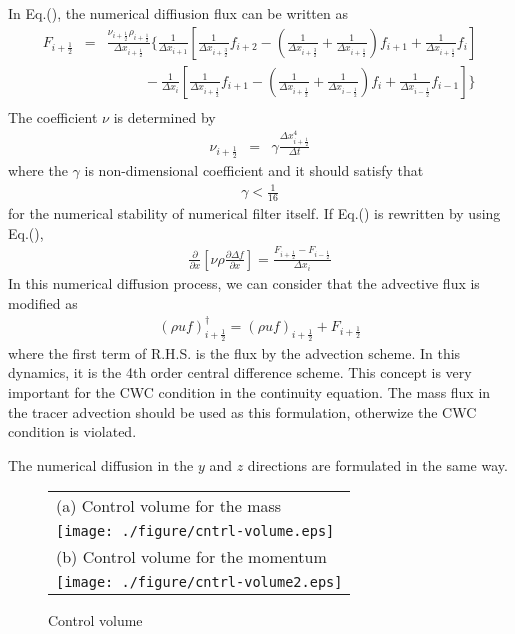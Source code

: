 In Eq.(), the numerical diffiusion flux can be written as
{\footnotesize
\begin{eqnarray}
F_{i+\frac{1}{2}}&=&\frac{\nu_{i+\frac{1}{2}}\rho_{i+\frac{1}{2}}}{\Delta x_{i+\frac{1}{2}}}
\Bigg\{\frac{1}{\Delta x_{i+1}}\left[
\frac{1}{\Delta x_{i+\frac{3}{2}}}f_{i+2}
-\left(\frac{1}{\Delta x_{i+\frac{3}{2}}}+\frac{1}{\Delta x_{i+\frac{1}{2}}}\right)f_{i+1}
+\frac{1}{\Delta x_{i+\frac{1}{2}}}f_{i}\right]\nonumber\\
&&~~~~~~~~~~~~ -\frac{1}{\Delta x_i}\left[
\frac{1}{\Delta x_{i+\frac{1}{2}}}f_{i+1}
-\left(\frac{1}{\Delta x_{i+\frac{1}{2}}}+\frac{1}{\Delta x_{i-\frac{1}{2}}}\right)f_i
+\frac{1}{\Delta x_{i-\frac{1}{2}}}f_{i-1}\right]\Bigg\}\nonumber\\
\end{eqnarray}
}
The coefficient $\nu$ is determined by
\begin{eqnarray}
  \nu_{i+\frac{1}{2}} &=& \gamma \frac{\Delta x_{i+\frac{1}{2}}^4}{\Delta t}
\end{eqnarray}
where  the $\gamma$ is non-dimensional coefficient and it should satisfy that
\begin{eqnarray}
\gamma < \frac{1}{16}
\end{eqnarray}
for the numerical stability of numerical filter itself.
If Eq.() is rewritten by using Eq.(), 
\begin{eqnarray}
\frac{\partial }{\partial x}\left[\nu \rho \frac{\partial \Delta f}{\partial x}\right]  
=
\frac{F_{i+\frac{1}{2}}-F_{i-\frac{1}{2}}}{\Delta x_{i}}
%
%
\end{eqnarray}
In this numerical diffusion process,
we can consider that the advective flux is modified as
\begin{eqnarray}
  (\rho u f)_{i+\frac{1}{2}}^{\dagger} = (\rho u f)_{i+\frac{1}{2}}+F_{i+\frac{1}{2}}
\end{eqnarray}
where the first term of R.H.S. is the flux by the advection scheme.
In this dynamics, it is the 4th order central difference scheme.
This concept is very important for the CWC condition in the continuity equation.
The mass flux in the tracer advection should be used as this formulation, 
otherwize the CWC condition is violated.

The numerical diffusion in the $y$ and $z$ directions
are formulated in the same way.



\begin{figure}[t]
\begin{center}
  \begin{tabular}{l}
    (a) Control volume for the mass\\
  \texttt{[image: ./figure/cntrl-volume.eps]}\\
    (b) Control volume for the momentum\\
  \texttt{[image: ./figure/cntrl-volume2.eps]}\\
  \end{tabular}
\end{center}
  \caption{Control volume}
  \label{fig:cntrl-volume}
\end{figure}
